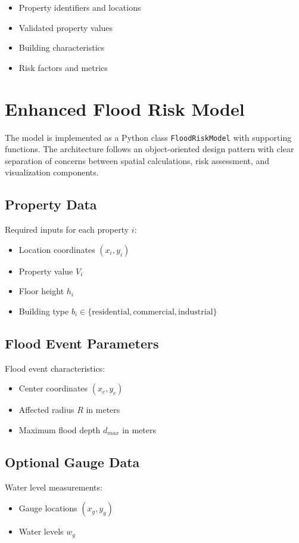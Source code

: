 \documentclass{article}
\begin{document}
\begin{itemize}
    \item Property identifiers and locations
    \item Validated property values
    \item Building characteristics
    \item Risk factors and metrics
\end{itemize}

\section{Enhanced Flood Risk Model}
The model is implemented as a Python class \texttt{FloodRiskModel} with supporting functions. The architecture follows an object-oriented design pattern with clear separation of concerns between spatial calculations, risk assessment, and visualization components.

\subsection{Property Data}
Required inputs for each property $i$:
\begin{itemize}
    \item Location coordinates $(x_i, y_i)$
    \item Property value $V_i$
    \item Floor height $h_i$
    \item Building type $b_i \in \{\text{residential}, \text{commercial}, \text{industrial}\}$
\end{itemize}

\subsection{Flood Event Parameters}
Flood event characteristics:
\begin{itemize}
    \item Center coordinates $(x_c, y_c)$
    \item Affected radius $R$ in meters
    \item Maximum flood depth $d_{max}$ in meters
\end{itemize}

\subsection{Optional Gauge Data}
Water level measurements:
\begin{itemize}
    \item Gauge locations $(x_g, y_g)$
    \item Water levels $w_g$
\end{itemize}
\end{document}
